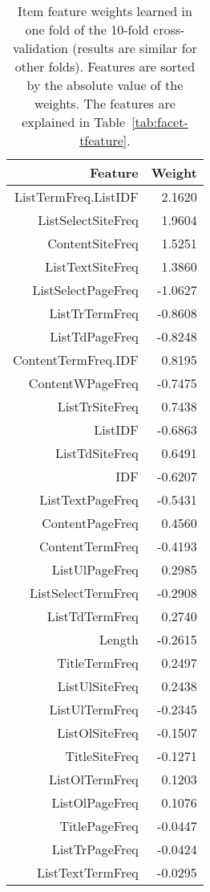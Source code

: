 \begin{table}[!htbp]
\centering
\caption{Item feature weights learned in one fold of the 10-fold cross-validation (results are similar for other folds). Features are sorted by the absolute value of the weights. The features are explained in Table~\ref{tab:facet-tfeature}.}
\label{tab:intrinsic-tanalysis}
\begin{tabular}{|r|r|} \hline
Feature & Weight \\ \hline
ListTermFreq.ListIDF & 2.1620 \\ \hline
ListSelectSiteFreq & 1.9604 \\ \hline
ContentSiteFreq & 1.5251 \\ \hline
ListTextSiteFreq & 1.3860 \\ \hline
ListSelectPageFreq & -1.0627 \\ \hline
ListTrTermFreq & -0.8608 \\ \hline
ListTdPageFreq & -0.8248 \\ \hline
ContentTermFreq.IDF & 0.8195 \\ \hline
ContentWPageFreq & -0.7475 \\ \hline
ListTrSiteFreq & 0.7438 \\ \hline
ListIDF & -0.6863 \\ \hline
ListTdSiteFreq & 0.6491 \\ \hline
IDF & -0.6207 \\ \hline
ListTextPageFreq & -0.5431 \\ \hline
ContentPageFreq & 0.4560 \\ \hline
ContentTermFreq & -0.4193 \\ \hline
ListUlPageFreq & 0.2985 \\ \hline
ListSelectTermFreq & -0.2908 \\ \hline
ListTdTermFreq & 0.2740 \\ \hline
Length & -0.2615 \\ \hline
TitleTermFreq & 0.2497 \\ \hline
ListUlSiteFreq & 0.2438 \\ \hline
ListUlTermFreq & -0.2345 \\ \hline
ListOlSiteFreq & -0.1507 \\ \hline
TitleSiteFreq & -0.1271 \\ \hline
ListOlTermFreq & 0.1203 \\ \hline
ListOlPageFreq & 0.1076 \\ \hline
TitlePageFreq & -0.0447 \\ \hline
ListTrPageFreq & -0.0424 \\ \hline
ListTextTermFreq & -0.0295 \\ \hline
\end{tabular}
\end{table}


